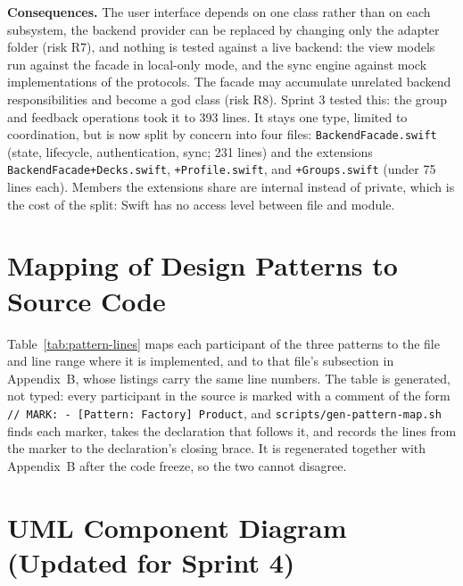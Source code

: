 \documentclass[12pt,letterpaper]{article}
\begin{document}
\textbf{Consequences.} The user interface depends on one class rather than on each
subsystem, the backend provider can be replaced by changing only the adapter folder
(risk R7), and nothing is tested against a live backend: the view models run against
the facade in local-only mode, and the sync engine against mock implementations of the
protocols. The facade may accumulate unrelated backend
responsibilities and become a god class (risk R8). Sprint 3 tested this: the group and
feedback operations took it to 393 lines. It stays one type, limited to coordination,
but is now split by concern into four files: \texttt{BackendFacade.swift} (state,
lifecycle, authentication, sync; 231 lines) and the extensions
\texttt{BackendFacade+Decks.swift}, \texttt{+Profile.swift}, and \texttt{+Groups.swift}
(under 75 lines each). Members the extensions share are internal instead of private,
which is the cost of the split: Swift has no access level between file and module.

\section{Mapping of Design Patterns to Source Code}\label{sec:patternmap}
Table~\ref{tab:pattern-lines} maps each participant of the three patterns to the file
and line range where it is implemented, and to that file's subsection in Appendix~B,
whose listings carry the same line numbers. The table is generated, not typed: every
participant in the source is marked with a comment of the form
\texttt{// MARK: - [Pattern: Factory] Product}, and \texttt{scripts/gen-pattern-map.sh}
finds each marker, takes the declaration that follows it, and records the lines from
the marker to the declaration's closing brace. It is regenerated together with
Appendix~B after the code freeze, so the two cannot disagree.

{\singlespacing\footnotesize

}

\section{UML Component Diagram (Updated for Sprint 4)}\label{sec:component}
\end{document}
